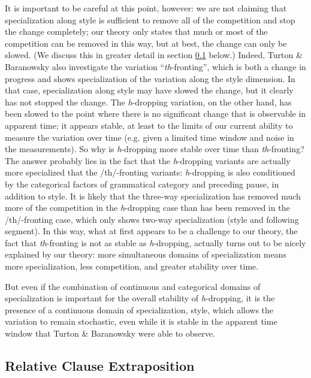 It is important to be careful at this point, however: we are not claiming that specialization along style is sufficient to remove all of the competition and stop the change completely; our theory only states that much or most of the competition can be removed in this way, but at best, the change can only be slowed.
(We discuss this in greater detail in section \ref{relclause} below.)
Indeed, Turton \& Baranowsky also investigate the variation ``\textsl{th}-fronting'', which is both a change in progress and shows specialization of the variation along the style dimension.
In that case, specialization along style may have slowed the change, but it clearly has not stopped the change.
The \textsl{h}-dropping variation, on the other hand, has been slowed to the point where there is no significant change that is observable in apparent time; it appears stable, at least to the limits of our current ability to measure the variation over time (e.g. given a limited time window and noise in the measurements).
So why is \textsl{h}-dropping more stable over time than \textsl{th}-fronting?
The answer probably lies in the fact that the \textsl{h}-dropping variants are actually more specialized that the /th/-fronting variants: \textsl{h}-dropping is also conditioned by the categorical factors of grammatical category and preceding pause, in addition to style.
It is likely that the three-way specialization has removed much more of the competition in the \textsl{h}-dropping case than has been removed in the /th/-fronting case, which only shows two-way specialization (style and following segment).
In this way, what at first appears to be a challenge to our theory, the fact that \textsl{th}-fronting is not as stable as \textsl{h}-dropping, actually turns out to be nicely explained by our theory: more simultaneous domains of specialization means more specialization, less competition, and greater stability over time.

But even if the combination of continuous and categorical domains of specialization is important for the overall stability of \textsl{h}-dropping, it is the presence of a continuous domain of specialization, style, which allows the variation to remain stochastic, even while it is stable in the apparent time window that Turton \& Baranowsky were able to observe.


\subsection{Relative Clause Extraposition}
\label{relclause}

